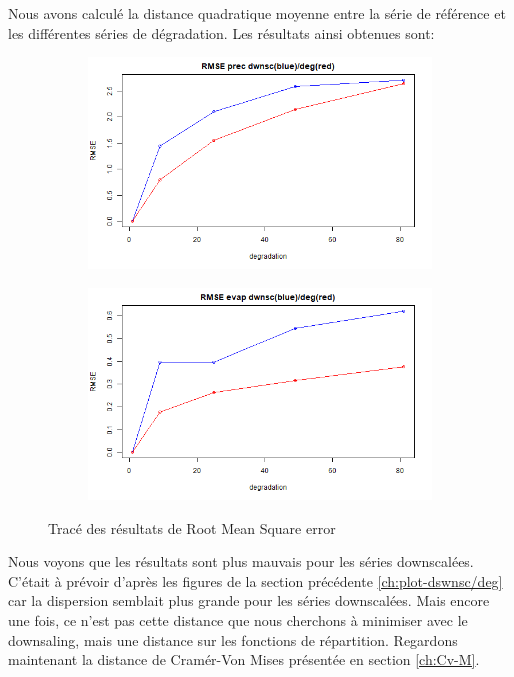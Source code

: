 \documentclass[a4paper,11pt]{article}
\begin{document}
Nous avons calculé la distance quadratique moyenne entre la série de référence et les différentes séries de dégradation. Les résultats ainsi obtenues sont:

\vspace{0.5cm}


\begin{figure}[!h]
	\label{fig: RMSE }
	\centering
	\begin{subfigure}[b]{0.45\textwidth}
		\includegraphics[scale=0.4]{images/RMSE_precip.png}
	\end{subfigure}
	\hfill
	\begin{subfigure}[b]{0.45\textwidth}
		\includegraphics[scale=0.4]{images/RMSE_evap.png}
	\end{subfigure}
	\caption{Tracé des résultats de Root Mean Square error}
\end{figure}
Nous voyons que les résultats sont plus mauvais pour les séries downscalées. C'était à prévoir d'après les figures de la section précédente \ref{ch:plot-dswnsc/deg} car la dispersion semblait plus grande pour les séries downscalées. Mais encore une fois, ce n'est pas cette distance que nous cherchons à minimiser avec le downsaling, mais une distance sur les fonctions de répartition. Regardons maintenant la distance de Cramér-Von Mises présentée en section \ref{ch:Cv-M}.
\end{document}
